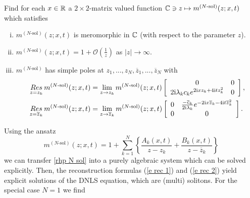 \begin{samepage}
\begin{framed}
\begin{rhp}\label{rhp N sol}
Find for each $x\in\mathbb R$ a $2\times 2$-matrix valued function $\mathbb C\ni z\mapsto m^{(N\text{-sol})} (z;x,t)$ which satisfies
\begin{enumerate}[(i)]
  \item $m^{(N\text{-sol})} (z;x,t)$ is meromorphic in $\mathbb C$ (with respect to the parameter $z$).
  \item $m^{(N\text{-sol})} (z;x,t)=1+\mathcal{O}\left(\frac{1}{z}\right)$ as $|z|\to\infty$.
  \item $m^{(N\text{-sol})} $ has simple poles at $z_1,...,z_N,\overline{z}_1,...,\overline{z}_N$ with
      \begin{equation*}%
        \begin{aligned}
          \res_{z=z_k}m^{(N\text{-sol})} (z;x,t)&=\lim_{z\to z_k}m^{(N\text{-sol})} (z;x,t)
          \left[
            \begin{array}{cc}
              0 & 0 \\
              2\ii\lambda_kc_k e^{2\ii xz_k+4\ii t z_k^2} & 0
            \end{array}
          \right],\\
          \res_{z=\overline{z}_k}m^{(N\text{-sol})} (z;x,t)&=\lim_{z\to \overline{z}_k}m^{(N\text{-sol})} (z;x,t)
          \left[
            \begin{array}{cc}
              0 & \frac{-\overline{c}_k}{2\ii\lambda_k} e^{-2\ii x\overline{z}_k-4\ii t \overline{z}_k^2} \\
              0 & 0
            \end{array}
          \right].
        \end{aligned}
      \end{equation*}
\end{enumerate}
\end{rhp}
\end{framed}
\end{samepage}
Using the ansatz
\begin{equation*}
    m^{(N\text{-sol})} (z;x,t)=1+\sum_{k=1}^N\left\{ \frac{A_k(x,t)}{z-z_k}+ \frac{B_k(x,t)}{z-\overline{z}_k}\right\}
\end{equation*}
we can transfer \rh \ref{rhp N sol} into a purely algebraic system which can be solved explicitly. Then, the reconstruction formulas (\ref{e rec 1}) and (\ref{e rec 2}) yield explicit solutions of the DNLS equation, which are (multi) solitons. For the special case $N=1$ we find
